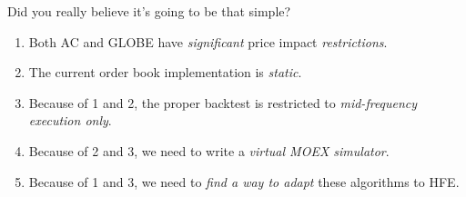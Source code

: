 \documentclass[]{beamer}
\begin{document}
\begin{frame}[t]
\begin{columns}[t]
\begin{column}{\twocolwid}
\begin{columns}[t,totalwidth=\twocolwid]
\begin{column}{\onecolwid}
    \end{column} %
    
    \end{columns} %
    
    
    \begin{alertblock}{Did you really believe it's going to be that simple?}
        \begin{enumerate}
            \item Both AC and GLOBE have \emph{significant} price impact \emph{restrictions}.
            \item The current order book implementation is \emph{static}.
            \item Because of 1 and 2, the proper backtest is restricted to \emph{mid-frequency execution only}.
            \item Because of 2 and 3, we need to write a \emph{virtual MOEX simulator}.
            \item Because of 1 and 3, we need to \emph{find a way to adapt} these algorithms to HFE.
        \end{enumerate} 
    \end{alertblock} 
    
    
    \begin{columns}[t,totalwidth=\twocolwid] %
    
    \begin{column}{\onecolwid} %
    
    

\end{column}
\end{columns}
\end{column}
\end{columns}
\end{frame}
\end{document}

